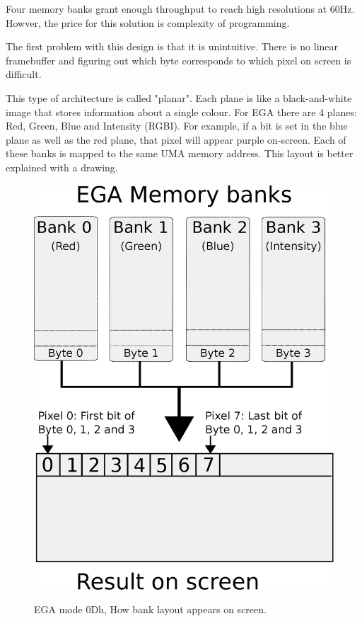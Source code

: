 \documentclass[book.tex]{subfiles}
\begin{document}
Four memory banks grant enough throughput to reach high resolutions at 60Hz. Howver, the price for this solution is complexity of programming. \\
\par
The first problem with this design is that it is unintuitive. There is no linear framebuffer and figuring out which byte corresponds to which pixel on screen is difficult.\\
\par
 This type of architecture is called "planar". Each plane is like a black-and-white image that stores information about a single colour. For EGA there are 4 planes: Red, Green, Blue and Intensity (RGBI). For example, if a bit is set in the blue plane as well as the red plane, that pixel will appear purple on-screen. Each of these banks is mapped to the same UMA memory address. This layout is better explained with a drawing.\\
\par
\begin{figure}[H]
\centering
\includegraphics[width=.57\textwidth]{imgs/drawings/ega_ram_screen_layout.eps}
\label{fig:ega_layout_banks}
\caption{EGA mode 0Dh, How bank layout appears on screen.}
\end{figure}

 
\end{document}
